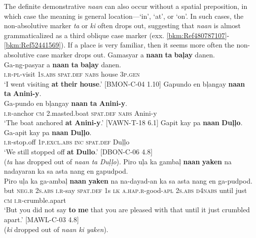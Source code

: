 The definite demonstrative \textit{naan} can also occur without a spatial preposition, in which case the meaning is general location---‘in’, ‘at’, or ‘on’. In such cases, the non-absolutive marker \textit{ta} or \textit{ki} often drops out, suggesting that \textit{naan} is almost grammaticalized as a third oblique case marker (exx. \ref{bkm:Ref480787107}{}-\ref{bkm:Ref52441569}). If a place is very familiar, then it seems more often the non-absolutive case marker drops out.
\ea
Gamasyar  a  \textbf{naan}  \textbf{ta}  \textbf{baļay}  danen. \\\smallskip
 \gll Ga-ng-pasyar  a  \textbf{naan}  \textbf{ta}  \textbf{baļay}  danen. \\
\textsc{i.r}-\textsc{pl}-visit  1\textsc{s.abs}  \textsc{spat.def}  \textsc{nabs}  house 3\textsc{p.gen} \\
\glt ‘I went visiting \textbf{at} \textbf{their} \textbf{house}.’ [BMON-C-04 1.10]
\z
\ea
Gapundo  en  bļangay  \textbf{naan}  \textbf{ta}  \textbf{Anini-y}. \\\smallskip
 \gll Ga-pundo  en  bļangay  \textbf{naan}  \textbf{ta}  \textbf{Anini-y}. \\
\textsc{i.r}-anchor  \textsc{cm}  2.masted.boat  \textsc{spat.def}  \textsc{nabs}  Anini-y \\
\glt ‘The boat anchored \textbf{at} \textbf{Anini-y}.’ [VAWN-T-18 6.1]
\z
\ea
\label{bkm:Ref480787107}
Gapit  kay  pa  \textbf{naan}  \textbf{Duļļo}. \\\smallskip
 \gll Ga-apit  kay  pa  \textbf{naan}  \textbf{Duļļo}. \\
\textsc{i.r}-stop.off  1\textsc{p.excl.abs}  \textsc{inc}  \textsc{spat.def}  Duļļo \\
\glt ‘We still stopped off \textbf{at} \textbf{Dullo}.’ [DBON-C-06 4.8] \\
(\textit{ta} has dropped out of \textit{naan ta Duļļo}).
\z
\ea
\label{bkm:Ref52441569}
Piro  uļa  ka  gambaļ  \textbf{naan}  \textbf{yaken} na  nadayaran ka  sa  asta  nang  en  gapudpod. \\\smallskip
 \gll Piro  uļa  ka  ga-ambaļ  \textbf{naan}  \textbf{yaken} na  na-dayad-an ka  sa  asta  nang  en  ga-pudpod. \\
but  \textsc{neg.r}  2\textsc{s.abs}  \textsc{i.r}-say  \textsc{spat.def}  1s
\textsc{lk}  \textsc{a.hap.r}-good-\textsc{apl}
2\textsc{s.abs}  \textsc{d}4\textsc{nabs}  until  just  \textsc{cm}  \textsc{i.r}-crumble.apart \\
\glt `But you did not say \textbf{to} \textbf{me} that you are pleased with that until it just crumbled apart.’ [MAWL-C-03 4.8] \\
(\textit{ki} dropped out of \textit{naan ki yaken}).
\z

